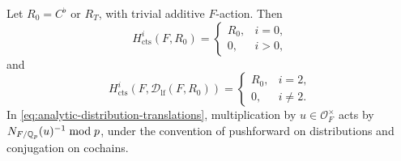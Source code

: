 \begin{lemma}
\label{lem:translation-cohomology}
Let \(R_0=C^\flat\) or \(R_T\), with trivial additive \(F\)-action.
Then
\begin{equation}
 H^i_{\mathrm{cts}}(F,R_0)=
 \begin{cases}R_0,&i=0,\\0,&i>0,\end{cases}
 \label{eq:analytic-constant-translations}
\end{equation}
and
\begin{equation}
 H^i_{\mathrm{cts}}(F,\mathcal D_{\mathrm{lf}}(F,R_0))=
 \begin{cases}R_0,&i=2,\\0,&i\neq2.\end{cases}
 \label{eq:analytic-distribution-translations}
\end{equation}
In \eqref{eq:analytic-distribution-translations},
multiplication by \(u\in\mathcal O_F^\times\) acts by
\(N_{F/\mathbb Q_p}(u)^{-1}\bmod p\), under the convention of pushforward
on distributions and conjugation on cochains.
\end{lemma}

